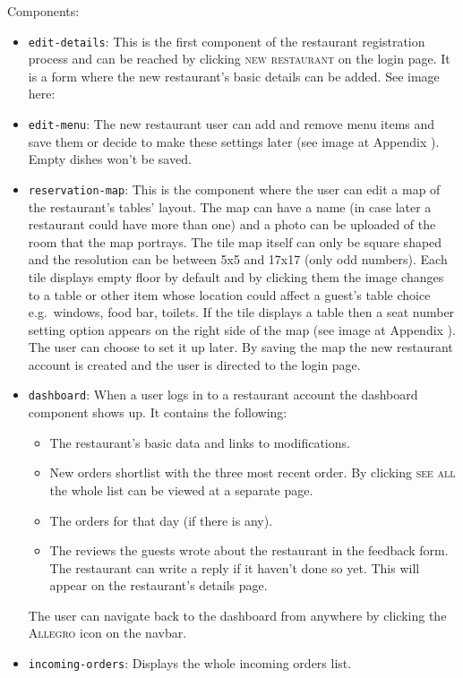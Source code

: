Components:
\begin{itemize}	
	\item \verb+edit-details+: This is the first component of the restaurant registration process and can be reached by clicking \textsc{new restaurant} on the login page.  It is a form where the new restaurant's basic details can be added. See image here: 
	\item \verb+edit-menu+:	The new restaurant user can add and remove menu items and save them or decide to make these settings later (see image at Appendix ). Empty dishes won't be saved.
	\item \verb+reservation-map+: This is the component where the user can edit a map of the restaurant's tables' layout. The map can have a name (in case later a restaurant could have more than one) and a photo can be uploaded of the room that the map portrays. The tile map itself can only be square shaped and the resolution can be between 5x5 and 17x17 (only odd numbers). Each tile displays empty floor by default and by clicking them the image changes to a table or other item whose location could affect a guest's table choice e.g.\ windows, food bar, toilets. If the tile displays a table then a seat number setting option appears on the right side of the map (see image at Appendix ). The user can choose to set it up later. By saving the map the new restaurant account is created and the user is directed to the login page. 
	\item \verb+dashboard+: When a user logs in to a restaurant account the dashboard component shows up. It contains the following:
	\begin{itemize}
		\item The restaurant's basic data and links to modifications.
		\item New orders shortlist with the three most recent order. By clicking \textsc{see all} the whole list can be viewed at a separate page.
		\item The orders for that day (if there is any).
		\item The reviews the guests wrote about the restaurant in the feedback form. The restaurant can write a reply if it haven't done so yet. This will appear on the restaurant's details page.
	\end{itemize}
The user can navigate back to the dashboard from anywhere by clicking the \textsc{Allegro} icon on the navbar.
	\item \verb+incoming-orders+: Displays the whole incoming orders list.
\end{itemize}
